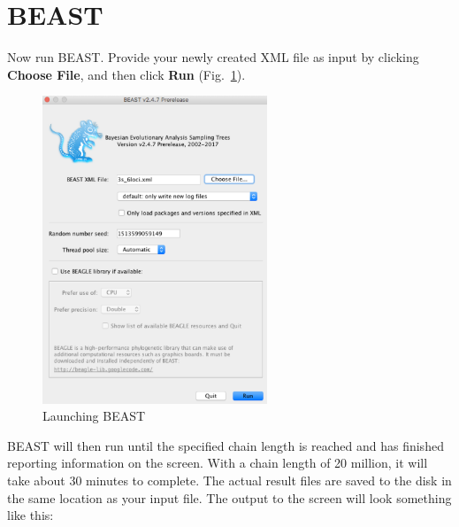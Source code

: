 \documentclass[11pt]{article}
\begin{document}
\section*{BEAST}

Now run BEAST. Provide your newly created XML file as input by clicking \textbf{Choose File}, and then click \textbf{Run} (Fig.~\ref{fig_beast}).

\begin{figure}[h]
\center
\includegraphics[width=0.6\textwidth]{figs/fig9_beast.png}
\caption{Launching BEAST}
\label{fig_beast}
\end{figure}

BEAST will then run until the specified chain length is reached and has finished reporting information on the screen. With a chain length of 20 million, it will take about 30 minutes to complete. The actual result files are saved to the disk in the same location as your input file. The output to the screen will look something like this: 
\end{document}
